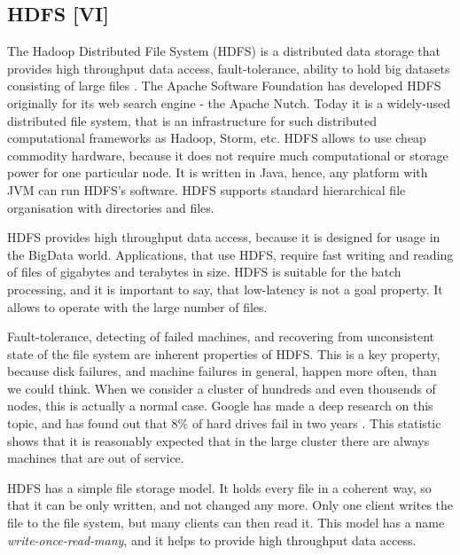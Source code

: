 \subsection{HDFS [VI]}
\label{subs:HDFS}

The Hadoop Distributed File System (HDFS) is a distributed data storage that provides high throughput data access, fault-tolerance, ability to hold big datasets consisting of large files \cite{HDFSArchitecture1, HDFSArchitecture2}.
The Apache Software Foundation has developed HDFS originally for its web search engine - the Apache Nutch.
Today it is a widely-used distributed file system, that is an infrastructure for such distributed computational frameworks as Hadoop, Storm, etc.
HDFS allows to use cheap commodity hardware, because it does not require much computational or storage power for one particular node.
It is written in Java, hence, any platform with JVM \cite{JVM} can run HDFS's software.
HDFS supports standard hierarchical file organisation with directories and files.


HDFS provides high throughput data access, because it is designed for usage in the BigData world.
Applications, that use HDFS, require fast writing and reading of files of gigabytes and terabytes in size.
HDFS is suitable for the batch processing, and it is important to say, that low-latency is not a goal property.
It allows to operate with the large number of files.

Fault-tolerance, detecting of failed machines, and recovering from unconsistent state of the file system are inherent properties of HDFS.
This is a key property, because disk failures, and machine failures in general, happen more often, than we could think.
When we consider a cluster of hundreds and even thousends of nodes, this is actually a normal case.
Google has made a deep research on this topic, and has found out that 8\% of hard drives fail in two years \cite{Pinheiro2007}.
This statistic shows that it is reasonably expected that in the large cluster there are always machines that are out of service.

HDFS has a simple file storage model.
It holds every file in a coherent way, so that it can be only written, and not changed any more.
Only one client writes the file to the file system, but many clients can then read it.
This model has a name \textit{write-once-read-many}, and it helps to provide high throughput data access.

